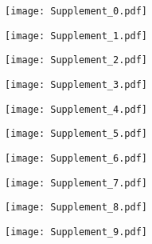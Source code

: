 \documentclass[12pt,a4paper]{article}
\begin{document}
 

\begin{figure}
%
\begin{minipage}{6cm}
\begin{minipage}{6cm} 
\texttt{[image: Supplement\_0.pdf]}
\vspace{0.2cm}
\end{minipage}
\vfill
\begin{minipage}{6cm} 
\texttt{[image: Supplement\_1.pdf]}
\vspace{0.2cm}
\end{minipage}
\vfill
\begin{minipage}{6cm} 
\texttt{[image: Supplement\_2.pdf]}
\vspace{0.2cm}
\end{minipage}
\vfill
\begin{minipage}{6cm} 
\texttt{[image: Supplement\_3.pdf]}
\vspace{0.2cm}
\end{minipage}
\vfill
\begin{minipage}{6cm} 
\texttt{[image: Supplement\_4.pdf]}
\vspace{0.2cm}
\end{minipage}
\end{minipage}
%
\hfill
\begin{minipage}{6.2cm}
\hspace{0.2cm}
\hfill
\begin{minipage}{6cm}
\begin{minipage}{6cm} 
\texttt{[image: Supplement\_5.pdf]}
\vspace{0.2cm}
\end{minipage}
\vfill
\begin{minipage}{6cm} 
\texttt{[image: Supplement\_6.pdf]}
\vspace{0.2cm}
\end{minipage}
\vfill
\begin{minipage}{6cm} 
\texttt{[image: Supplement\_7.pdf]}
\vspace{0.2cm}
\end{minipage}
\vfill
\begin{minipage}{6cm} 
\texttt{[image: Supplement\_8.pdf]}
\vspace{0.2cm}
\end{minipage}
\vfill
\begin{minipage}{6cm} 
\texttt{[image: Supplement\_9.pdf]}
\vspace{0.2cm}

\end{minipage}
\end{minipage}
\end{minipage}
\end{figure}
\end{document}
